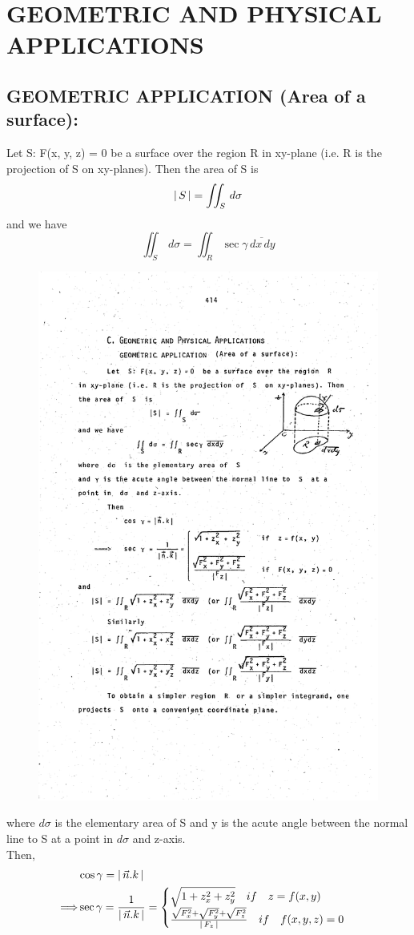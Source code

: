 \documentclass[11pt]{amsbook}
\begin{document}
    \section{GEOMETRIC AND PHYSICAL APPLICATIONS}
    \subsection{GEOMETRIC APPLICATION (Area of a surface): }
    Let S: F(x, y, z) = 0 be a surface over the region R
in xy-plane (i.e. R is the projection of S on xy-planes). Then
the area of S is
    \begin{equation*}
        \left \lvert \, S \, \right \rvert=\iint_S \,d\sigma 
    \end{equation*}    
    and we have\\
    \begin{equation*}
        \iint_S \,d\sigma= \iint_R \sec \gamma \overline {\,dx \,dy}
    \end{equation*}    	
\begin {figure}[ htbp ]
\begin {center}
\includegraphics[width=0.4\columnwidth]{images/b2p1-130.pdf}


\label {fig: image}
\end{center}
\end{figure}

    where $d\sigma$ is the elementary area of S and y is the acute angle between the normal line to S at a point in $d\sigma$ and z-axis.\\
    Then,
    \begin{align*}       
    &\cos \gamma= \left \lvert \, \vec{n}.k \, \right \rvert\\
    \Longrightarrow&\sec \gamma= \frac{1}{\left \lvert \, \vec{n}.k \, \right \rvert}=
    \begin{cases}
        \sqrt{1+z_{x}^{2}+z_{y}^{2}}\quad if \quad z=f(x,y)\\
        \frac{\sqrt{F_{x}^{2}}+\sqrt{F_{y}^{2}}+\sqrt{F_{z}^{2}}}{\left \lvert \, F_{z} \, \right \rvert}\quad if \quad f(x,y,z)=0
    \end{cases}
    \end{align*}
\end{document}
